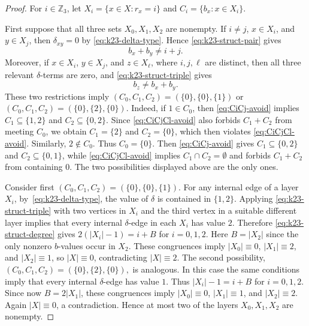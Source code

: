 \documentclass[10pt,a4paper]{amsart}
\newcommand{\Z}{\mathbb Z}
\begin{document}
\begin{proof}
    For $i\in\Z_3$, let $X_i=\{x\in X:r_x=i\}$ and $C_i=\{b_x:x\in X_i\}$.

    First suppose that all three sets \(X_0,X_1,X_2\) are nonempty.
    If $i\ne j$, $x\in X_i$, and $y\in X_j$, then $\delta_{xy}=0$ by \eqref{eq:k23-delta-type}. Hence \eqref{eq:k23-struct-pair} gives
    \begin{equation}\label{eq:CiCj-avoid}
        b_x+b_y\ne i+j.
    \end{equation}
    Moreover, if \(x\in X_i\), \(y\in X_j\), and \(z\in X_\ell\), where \(i,j,\ell\) are distinct, then all three relevant \(\delta\)-terms are zero, and \eqref{eq:k23-struct-triple} gives
    \begin{equation}\label{eq:CiCjCl-avoid}
        b_z\ne b_x+b_y.
    \end{equation}
    These two restrictions imply $(C_0,C_1,C_2)=(\{0\},\{0\},\{1\})$ or $(C_0,C_1,C_2)=(\{0\},\{2\},\{0\})$.
    Indeed, if \(1\in C_0\), then \eqref{eq:CiCj-avoid} implies \(C_1\subseteq\{1,2\}\) and \(C_2\subseteq\{0,2\}\). Since \eqref{eq:CiCjCl-avoid} also forbids \(C_1+C_2\) from meeting \(C_0\), we obtain \(C_1=\{2\}\) and \(C_2=\{0\}\), which then violates \eqref{eq:CiCjCl-avoid}. Similarly, \(2\notin C_0\). Thus \(C_0=\{0\}\). Then \eqref{eq:CiCj-avoid} gives \(C_1\subseteq\{0,2\}\) and \(C_2\subseteq\{0,1\}\), while \eqref{eq:CiCjCl-avoid} implies \(C_1\cap C_2=\emptyset\) and forbids \(C_1+C_2\) from containing \(0\). The two possibilities displayed above are the only ones.

    Consider first
    \((C_0,C_1,C_2)=(\{0\},\{0\},\{1\}).\)
    For any internal edge of a layer \(X_i\), by~\eqref{eq:k23-delta-type}, the value of \(\delta\) is contained in \(\{1,2\}\). Applying \eqref{eq:k23-struct-triple} with two vertices in \(X_i\) and the third vertex in a suitable different layer implies that every internal \(\delta\)-edge in each \(X_i\) has value \(2\). Therefore \eqref{eq:k23-struct-degree} gives $2(|X_i|-1)=i+B$ for $i=0,1,2$. Here $B=|X_2|$ since the only nonzero \(b\)-values occur in \(X_2\).  These congruences imply $|X_0|\equiv0$, $|X_1|\equiv2$, and $|X_2|\equiv1$, so $|X|\equiv0$, contradicting $|X|\equiv2$.
    The second possibility,
    \((C_0,C_1,C_2)=(\{0\},\{2\},\{0\}),\)
    is analogous. In this case the same conditions imply that every internal \(\delta\)-edge has value \(1\). Thus $|X_i|-1=i+B$ for $i=0,1,2$. Since now \(B=2|X_1|\), these congruences imply $|X_0|\equiv0$, $|X_1|\equiv1$, and $|X_2|\equiv2$. Again \(|X|\equiv 0\), a contradiction. Hence at most two of the layers \(X_0,X_1,X_2\) are nonempty.


\end{proof}
\end{document}
